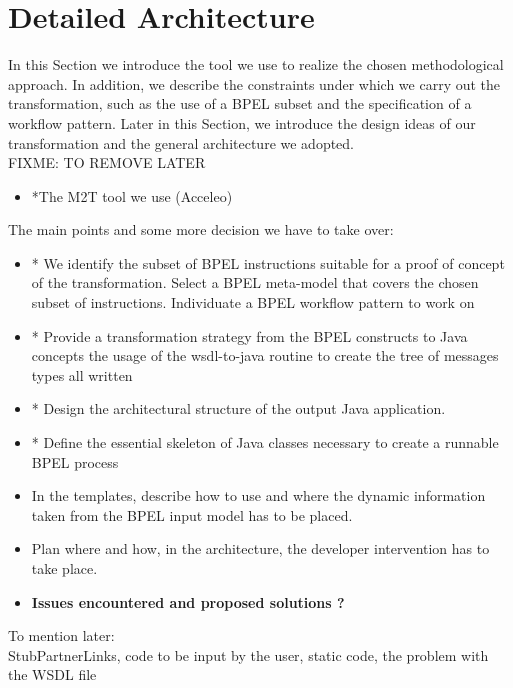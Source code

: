 \section{Detailed Architecture}
\label{DetailedArchitecture}
In this Section we introduce the tool we use to realize the chosen methodological approach. In addition, we describe the constraints under which we carry out the transformation, such as the use of a BPEL subset and the specification of a workflow pattern.
Later in this Section, we introduce the design ideas of our transformation and the general architecture we adopted.\\

FIXME: TO REMOVE LATER
\begin{itemize}
 \item *The M2T tool we use (Acceleo)
\end{itemize}

The main points and some more decision we have to take over:
\begin{itemize}
  \item * We identify the subset of BPEL instructions suitable for a proof of concept of the transformation. 
  \subitem * Select a BPEL meta-model that covers the chosen subset of instructions.
  \subitem * Individuate a BPEL workflow pattern to work on 
 
 \item * Provide a transformation strategy from the BPEL constructs to Java concepts
    \subitem * the usage of the wsdl-to-java routine to create the tree of messages types
    \subitem * all written
 \item * Design the architectural structure of the output Java application.
 \item * Define the essential skeleton of Java classes necessary to create a runnable BPEL process
 \item In the templates, describe how to use and where the dynamic information taken from the BPEL input model has to be placed.
 \item Plan where and how, in the architecture, the developer intervention has to take place.
 \item \textbf{Issues encountered and proposed solutions  ?}
\end{itemize} 
 
 To mention later: \\
 StubPartnerLinks, code to be input by the user, static code, the problem with the WSDL file


